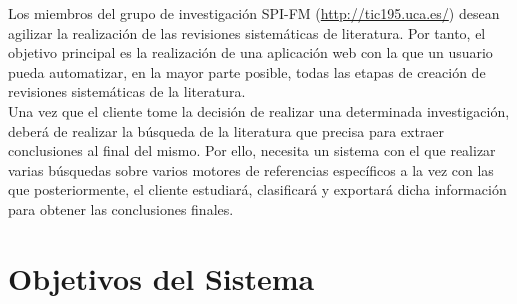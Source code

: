 Los miembros del grupo de investigación SPI-FM (\url{http://tic195.uca.es/}) desean agilizar la realización de las revisiones sistemáticas de literatura. Por tanto, el objetivo principal es la realización de una aplicación web con la que un usuario pueda automatizar, en la mayor parte posible, todas las etapas de creación de revisiones sistemáticas de la literatura.\\

Una vez que el cliente tome la decisión de realizar una determinada investigación, deberá de realizar la búsqueda de la literatura que precisa para extraer conclusiones al final del mismo. Por ello, necesita un sistema con el que realizar varias búsquedas sobre varios motores de referencias específicos a la vez con las que posteriormente, el cliente estudiará, clasificará y exportará dicha información para obtener las conclusiones finales.\\


\section{Objetivos del Sistema}


